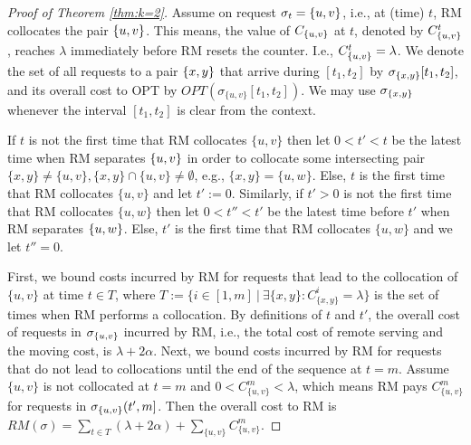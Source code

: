 \documentclass[a4paper,anonymous,USenglish]{lipics-v2019}
\newcommand{\OPT}{\textsc{OPT}\xspace}
\newcommand{\RM}{\textsc{RM}\xspace} %
\DeclarePairedDelimiter\set{\{}{\}}
\begin{document}
\begin{proof}[Proof of Theorem \ref{thm:k=2}]
	Assume on request $\sigma_{t}=\set{u,v}$, 
	i.e., at (time) $t$,
	\RM collocates the pair $\set{u,v}$.
	This means,
	the value of $C_{\set{u,v}}$ at $t$,
	denoted by $C^t_{\set{u,v}}$, 
	reaches $\lambda$ immediately before \RM resets the counter.
	I.e.,
	$ C^t_{\set{u,v}} = \lambda$.
	We denote the set of all requests to a pair $\set{x,y}$ that arrive
	during $[t_1,t_2]$ by $\sigma_{\set{x,y}}[t_1,t_2]$,
	and its overall cost to \OPT by
	$\mathit{OPT} (\sigma_{\{u,v\}}[t_1,t_2])$.
	We may use $\sigma_{\set{x,y}}$ whenever
	 the interval $[t_1,t_2]$ is clear from the context.
	
	If $t$ is not the first time that \RM collocates $\{u,v\}$ then
	let $0 < t' < t$ be the latest time when \RM separates $\set{u,v}$
	in order to collocate some intersecting pair
	$\{x,y\} \neq \{u,v\}, \{x,y\} \cap \{u,v\} \neq \emptyset$, 
	e.g.,
	$\{x,y\}=\{u,w\}$.
	Else,
	$t$ is the first time that \RM collocates $\{u,v\}$ and let $t' := 0$.
	Similarly,
	if $t' > 0$ is not the first time that \RM  collocates $\{u,w\}$ 
	then let $0 < t'' < t'$ be the latest time before $t'$ when \RM separates $\set{u,w}$.
	Else,
	$t'$ is the first time that \RM collocates $\{u,w\}$ and we let $t''=0$.
	
	First,
	we bound  costs incurred by \RM for requests that
	lead to the collocation of $\{u,v\}$ at time $t \in T$, where
	$T := \{ i \in [1,m] ~\vert~ \exists \{x,y\}: C^{i}_{\{x,y\}} = \lambda \}$
	is the set of times when \RM performs a collocation.
	By definitions of $t$ and $t'$,
	the overall cost of requests in $\sigma_{\set{u,v}}$ incurred by \RM,
	i.e., the total cost of remote serving
	and the moving cost, is
	$\lambda + 2\alpha$.	
	Next,
	we bound costs incurred by \RM
	for requests that do not lead to collocations until the  end of the sequence at $t=m$.
	Assume $\{u,v\}$ is not collocated at $t=m$
	and $0 < C^{m}_{ \{u,v\} } < \lambda $,
	which means \RM pays $C^{m}_{ \{u,v\} }$
	for  requests in $\sigma_{\set{u,v}}(t',m]$.
    Then the overall cost to \RM is
$	\mathit{RM} (\sigma)
=
\sum_{ t \in T}(\lambda + 2\alpha) +
\sum_{\{u,v\}} C^{m}_{\{u,v\}}	
$.
	

\end{proof}
\end{document}

